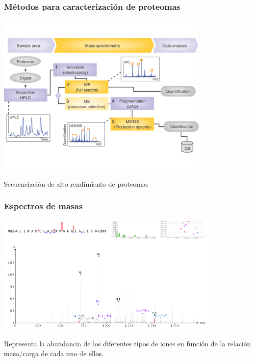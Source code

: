 \documentclass[10pt]{beamer}
\begin{document}
\begin{frame}
\frametitle{Métodos para caracterización de proteomas}
\begin{center}
\includegraphics[width=10.5cm]{imagenes/WF}
\end{center}
\begin{center}
Secuenciación de alto rendimiento de proteomas
\end{center}
\end{frame}
\begin{frame}
\frametitle{Espectros de masas}
\begin{center}
\includegraphics[width=11cm]{imagenes/Espectro}
\end{center}
\begin{center}
Representa la abundancia de los diferentes tipos de iones en función de la relación masa/carga de cada uno de ellos.
\end{center}
\end{frame}
\end{document}
